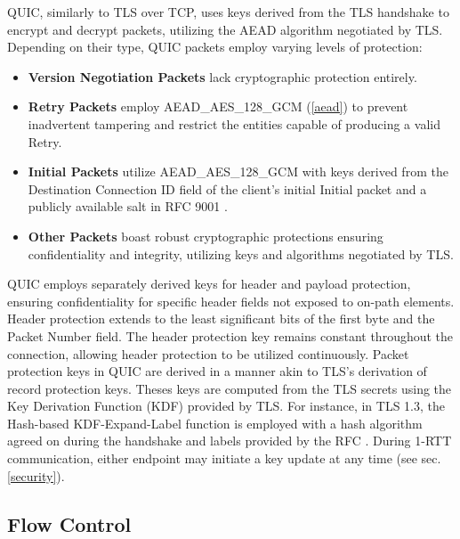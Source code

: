 QUIC, similarly to TLS over TCP, uses keys derived from the TLS handshake to encrypt and decrypt packets, utilizing the AEAD algorithm negotiated by TLS. Depending on their type, QUIC packets employ varying levels of protection:
\begin{itemize}
    \item \textbf{Version Negotiation Packets} lack cryptographic protection entirely.
    \item \textbf{Retry Packets} employ AEAD\_AES\_128\_GCM (\ref{aead}) to prevent inadvertent tampering and restrict the entities capable of producing a valid Retry.
    \item \textbf{Initial Packets} utilize AEAD\_AES\_128\_GCM with keys derived from the Destination Connection ID field of the client's initial Initial packet and a publicly available salt in RFC 9001 \cite[20]{rfc9001}.
    \item \textbf{Other Packets} boast robust cryptographic protections ensuring confidentiality and integrity, utilizing keys and algorithms negotiated by TLS.
\end{itemize}

QUIC employs separately derived keys for header and payload protection, ensuring confidentiality for specific header fields not exposed to on-path elements. Header protection extends to the least significant bits of the first byte and the Packet Number field. The header protection key remains constant throughout the connection, allowing header protection to be utilized continuously. Packet protection keys in QUIC are derived in a manner akin to TLS's derivation of record protection keys. Theses keys are computed from the TLS secrets using the Key Derivation Function (KDF) provided by TLS. For instance, in TLS 1.3, the Hash-based KDF-Expand-Label function is employed with a hash algorithm agreed on during the handshake and labels provided by the RFC \cite[20]{rfc9001}. During 1-RTT communication, either endpoint may initiate a key update at any time (see sec. \ref{security}).

\subsection{Flow Control} \label{flow_control}

